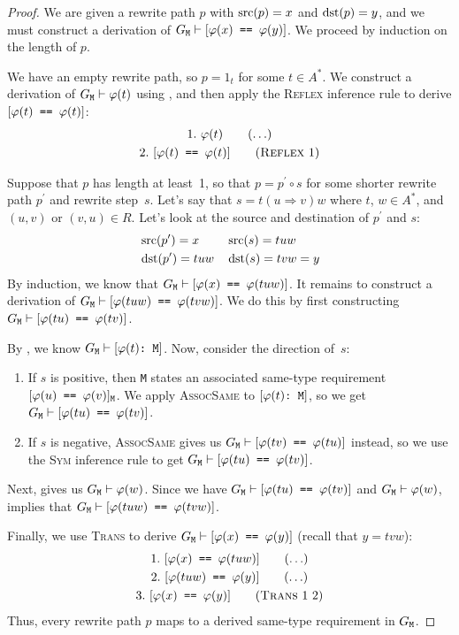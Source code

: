 \documentclass[../generics]{subfiles}
\begin{document}
\begin{proof}
We are given a rewrite path $p$ with $\operatorname{src}(p)=x$ and $\operatorname{dst}(p)=y$, and we must construct a derivation of $G_\texttt{M}\vdash[\texttt{$\varphi(x)$ == $\varphi(y)$}]$. We proceed by induction on the length of $p$.

\BaseCase We have an empty rewrite path, so $p=1_t$ for some $t\in A^*$. We construct a derivation of $G_\texttt{M}\vdash\varphi(t)$ using , and then apply the \textsc{Reflex} inference rule to derive $[\texttt{$\varphi(t)$ == $\varphi(t)$}]$:
\begin{gather*}
\AnyStep{\varphi(t)}{1}\\
\ReflexStep{1}{$\varphi(t)$}{2}
\end{gather*}

\InductiveStep Suppose that $p$ has length at least~1, so that $p=p^\prime \circ s$ for some shorter rewrite path $p^\prime$ and rewrite step~$s$. Let's say that $s = t(u\Rightarrow v)w$ where $t$, $w\in A^*$, and $(u,v)$ or $(v,u)\in R$. Let's look at the source and destination of $p^\prime$ and $s$:
\begin{align*}
&\operatorname{src}(p^\prime)=x
&&\operatorname{src}(s) = tuw\\
&\operatorname{dst}(p^\prime)=tuw
&&\operatorname{dst}(s) = tvw=y
\end{align*}
By induction, we know that $G_\texttt{M}\vdash[\texttt{$\varphi(x)$ == $\varphi(tuw)$}]$. It remains to construct a derivation of $G_\texttt{M}\vdash[\texttt{$\varphi(tuw)$ == $\varphi(tvw)$}]$. We do this by first constructing $G_\texttt{M}\vdash[\texttt{$\varphi(tu)$ == $\varphi(tv)$}]$.

By , we know $G_\texttt{M}\vdash[\texttt{$\varphi(t)$:~M}]$. Now, consider the direction of~$s$:
\begin{enumerate}
\item If $s$ is positive, then \texttt{M} states an associated same-type requirement $[\texttt{$\varphi(u)$ == $\varphi(v)$}]_\texttt{M}$. We apply \textsc{AssocSame} to $[\texttt{$\varphi(t)$:~M}]$, so we get $G_\texttt{M}\vdash[\texttt{$\varphi(tu)$ == $\varphi(tv)$}]$.
\item If $s$ is negative, \textsc{AssocSame} gives us $G_\texttt{M}\vdash[\texttt{$\varphi(tv)$ == $\varphi(tu)$}]$ instead, so we use the \textsc{Sym} inference rule to get $G_\texttt{M}\vdash[\texttt{$\varphi(tu)$ == $\varphi(tv)$}]$.
\end{enumerate}
Next,  gives us $G_\texttt{M}\vdash\varphi(w)$. Since we have $G_\texttt{M}\vdash[\texttt{$\varphi(tu)$ == $\varphi(tv)$}]$ and $G_\texttt{M}\vdash\varphi(w)$,  implies that $G_\texttt{M}\vdash[\texttt{$\varphi(tuw)$ == $\varphi(tvw)$}]$.

Finally, we use \textsc{Trans} to derive $G_\texttt{M}\vdash[\texttt{$\varphi(x)$ == $\varphi(y)$}]$ (recall that $y=tvw$):
\begin{gather*}
\AnyStep{\SameReqPhi{x}{tuw}}{1}\\
\AnyStep{\SameReqPhi{tuw}{y}}{2}\\
\TransStep{1}{2}{$\varphi(x)$}{$\varphi(y)$}{3}
\end{gather*}
Thus, every rewrite path $p$ maps to a derived same-type requirement in $G_\texttt{M}$.
\end{proof}
\end{document}
